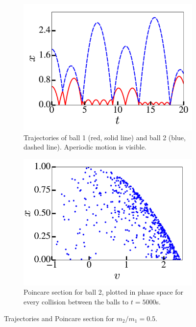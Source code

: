 \documentclass[pra,twocolumn,showpacs,amsmath,amssymb, aps, 10pt]{revtex4-1}
\begin{document}
\begin{figure}
  \begin{subfigure}{0.8\linewidth}
    \includegraphics[width=\linewidth]{r2_0_traj}
    \caption{Trajectories of ball 1 (red, solid line) and ball 2 (blue, dashed line).
    Aperiodic motion is visible.}
    \label{fig:2-traj}
  \end{subfigure}

  \begin{subfigure}{0.8\linewidth}
    \includegraphics[width=\linewidth]{r2_0_poincare}
    \caption{Poincare section for ball 2, plotted in phase space for every collision
    between the balls to $t=5000$s.}
    \label{fig:2-poincare}
  \end{subfigure}

  \caption{Trajectories and Poincare section for $m_2/m_1 = 0.5$.}
\end{figure}
\end{document}
